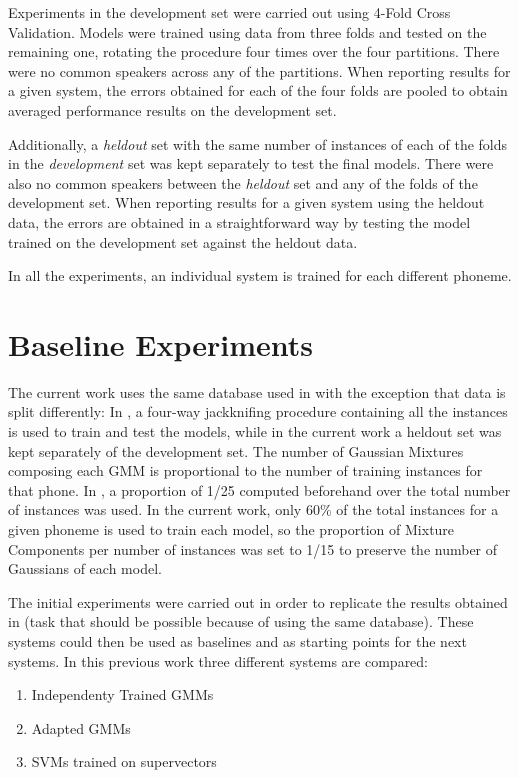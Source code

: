 Experiments in the development set were carried out using 4-Fold Cross Validation. Models
were trained using data from three folds and tested on the remaining one, rotating the
procedure four times over the four partitions. There were no common speakers across any of
the partitions. When reporting results for a given system, the errors obtained for each of the
four folds are pooled to obtain averaged performance results on the development set.

Additionally, a \textit{heldout} set with the same number of instances of each of the folds
in the \textit{development} set
was kept separately to test the final models. There were also no common speakers between
the \textit{heldout} set and any of the folds of the development set. When reporting results
for a given system using the heldout data, the errors are obtained in a straightforward way
by testing the model trained on the development set against the heldout data.

In all the experiments, an individual system is trained for each different phoneme.

\section{Baseline Experiments}

The current work uses the same database used in \cite{main} with the exception that
data is split differently:
In \cite{main}, a four-way jackknifing procedure containing all the instances is used to train
and test the models, while in the current work a heldout set was kept separately of the development
set. The number of Gaussian Mixtures composing each GMM is proportional to the number of
training instances for that phone. In \cite{main}, a proportion of 1/25 computed
beforehand over the total number of instances was used. In the current work, only 60\% of the
total instances for a given phoneme is used to train each model, so the proportion of Mixture
Components per number of instances was set to 1/15 to preserve the number of Gaussians of each
model.

The initial experiments were carried out in order to replicate the results obtained in \cite{main} (task that should be possible because of using the same database).
These systems could then be used as baselines and as starting points for the next systems.
In this previous work three different systems are compared:

\begin{enumerate}
	\item Independenty Trained GMMs
	\item Adapted GMMs
	\item SVMs trained on supervectors
\end{enumerate}

